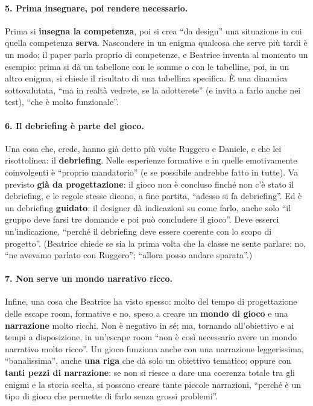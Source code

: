 \paragraph{5. Prima insegnare, poi rendere necessario.} Prima si \textbf{insegna la
competenza}, poi si crea ``da design'' una situazione in cui quella competenza
\textbf{serva}. Nascondere in un enigma qualcosa che serve più tardi è un modo; il
paper parla proprio di competenze, e Beatrice inventa al momento un esempio: prima si
dà un tabellone con le somme o con le tabelline, poi, in un altro enigma, si chiede il
risultato di una tabellina specifica. È una dinamica sottovalutata, ``ma in realtà
vedrete, se la adotterete'' (e invita a farlo anche nei test), ``che è molto
funzionale''.

\paragraph{6. Il debriefing è parte del gioco.} Una cosa che, crede, hanno già detto
più volte Ruggero e Daniele, e che lei risottolinea: il \textbf{debriefing}. Nelle
esperienze formative e in quelle emotivamente coinvolgenti è ``proprio mandatorio'' (e
se possibile andrebbe fatto in tutte). Va previsto \textbf{già da progettazione}: il
gioco non è concluso finché non c'è stato il debriefing, e le regole stesse dicono, a
fine partita, ``adesso si fa debriefing''. Ed è un debriefing \textbf{guidato}: il
designer dà indicazioni su come farlo, anche solo ``il gruppo deve farsi tre domande e
poi può concludere il gioco''. Deve esserci un'indicazione, ``perché il debriefing deve
essere coerente con lo scopo di progetto''. (Beatrice chiede se sia la prima volta che
la classe ne sente parlare: no, ``ne avevamo parlato con Ruggero''; ``allora posso
andare sparata''.)

\paragraph{7. Non serve un mondo narrativo ricco.} Infine, una cosa che Beatrice ha
visto spesso: molto del tempo di progettazione delle escape room, formative e no,
speso a creare un \textbf{mondo di gioco} e una \textbf{narrazione} molto ricchi. Non è
negativo in sé; ma, tornando all'obiettivo e ai tempi a disposizione, in un'escape room
``non è così necessario avere un mondo narrativo molto ricco''. Un gioco funziona anche
con una narrazione leggerissima, ``banalissima'', anche \textbf{una riga} che dà solo un
obiettivo tematico; oppure con \textbf{tanti pezzi di narrazione}: se non si riesce a
dare una coerenza totale tra gli enigmi e la storia scelta, si possono creare tante
piccole narrazioni, ``perché è un tipo di gioco che permette di farlo senza grossi
problemi''.

